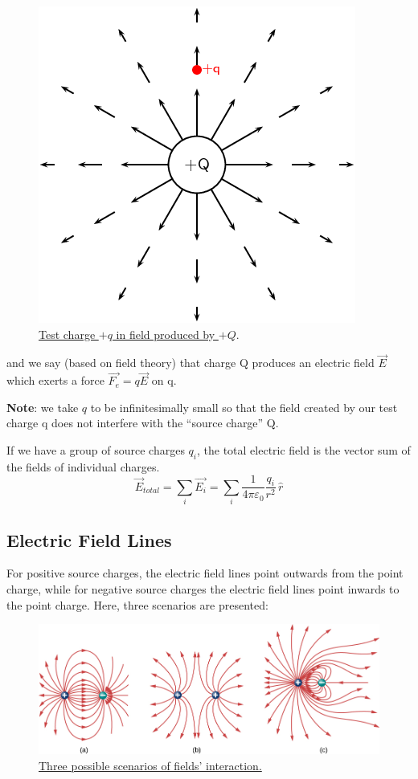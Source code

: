 \documentclass[11pt, letterpaper]{article}
\begin{document}
	\begin{figure}[h!]
		\centering
		\includegraphics[scale=0.3]{point-charge}
		\caption{\href{https://intl.siyavula.com/read/science/grade-11/electrostatics/09
		-electrostatics-03}{Test charge $+q$ in field produced by $+Q$}.}
		\label{fig:point-charge}
	\end{figure}
	\noindent and we say (based on field theory) that charge Q produces an electric field $\vec{E}$ 		which exerts a force $\vec{F_e} = q\vec{E}$ on q.

	\noindent\textbf{Note}: we take $q$ to be infinitesimally small so that the field created by our 			test charge q does not interfere with the ``source charge'' Q.

	If we have a group of source charges $q_i$, the total electric field is the vector sum of the fields 
	of individual charges. \[\vec{E}_{total} = \displaystyle\sum_{i}\vec{E_i} = \displaystyle\sum_{i}
	\frac{1}{4\pi\varepsilon_0}\frac{q_i}{r^2}\,\hat{r}\]

\newpage
	\subsection{Electric Field Lines}
	For positive source charges, the electric field lines point outwards from the point charge, while
	for negative source charges the electric field lines point inwards to the point charge. Here, three
	scenarios are presented:

	\begin{figure}[h!]
		\centering
		\includegraphics[scale=0.6]{three-scenarios}
		\caption{\href{https://tinyurl.com/v7fu6vm}{Three possible scenarios of fields' interaction.}}
		\label{fig:field-lines}
	\end{figure}
\end{document}
